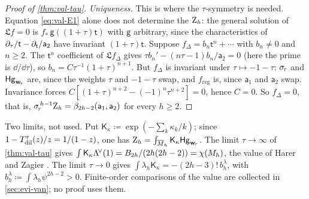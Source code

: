 \begin{proof}[Proof of \cref{thm:val-tau}]
\emph{Uniqueness.} This is where the $\tau$-symmetry is needed. Equation \eqref{eq:val-E1} alone does not determine the $\mathrm{Z}_h$: the general solution of $\mathfrak{L}f=0$ is $f_*\,\mathsf{g}((1+\tau)\mathsf{t})$ with $\mathsf{g}$ arbitrary, since the characteristics of $\partial_\tau/\mathsf{t}-\partial_{\mathsf{t}}/\mathsf{a}_2$ have invariant $(1+\tau)\mathsf{t}$. Suppose $f_{\Delta}=b_n\mathsf{t}^n+\cdots$ with $b_n\neq 0$ and $n\geq 2$. The $\mathsf{t}^n$ coefficient of $\mathfrak{L}f_{\Delta}$ gives $\tau b_n'-(n\tau-1)b_n/\mathsf{a}_2=0$ (here the prime is $\dd/\dd\tau$), so $b_n=C\tau^{-1}(1+\tau)^{n+1}$. But $f_{\Delta}$ is invariant under $\tau\mapsto-1-\tau$: $\sigma_{\!\tau}$ and $\mathsf{Hg}_{\mathbf{w}_{\!\tau}}$ are, since the weights $\tau$ and $-1-\tau$ swap, and $f_{\mathrm{reg}}$ is, since $\mathsf{a}_1$ and $\mathsf{a}_2$ swap. Invariance forces $C[(1+\tau)^{n+2}-(-1)^n\tau^{n+2}]=0$, hence $C=0$. So $f_{\Delta}=0$, that is, $\sigma_{\!\tau}^{\,h-1}\mathrm{Z}_h=\beta_{2h-2}(\mathsf{a}_1,\mathsf{a}_2)$ for every $h\geq 2$.
\end{proof}

\begin{rmk}
Two limits, not used. Put $\mathsf{K}_{\kappa}\coloneqq\exp(-\sum_k\kappa_k/k)$; since $1-T_{\mathrm{dil}}^{\tau}(z)/z=1/(1-z)$, one has $\mathrm{Z}_h=\int_{\overline{M}_h}\mathsf{K}_{\kappa}\mathsf{Hg}_{\mathbf{w}_{\!\tau}}$. The limit $\tau\to\infty$ of \cref{thm:val-tau} gives $\int\mathsf{K}_{\kappa}\Lambda^{\!\vee}(1)=B_{2h}/(2h(2h-2))=\chi(M_h)$, the value of Harer and Zagier \cite{HZ86}. The limit $\tau\to 0$ gives $\int\lambda_h\mathsf{K}_{\kappa}=-(2h-3)!\,b^{\lambda}_h$, with $b^{\lambda}_h\coloneqq\int\lambda_h\psi^{2h-2}>0$. Finite-order comparisons of the value are collected in \cref{sec:evi-van}; no proof uses them.
\end{rmk}
